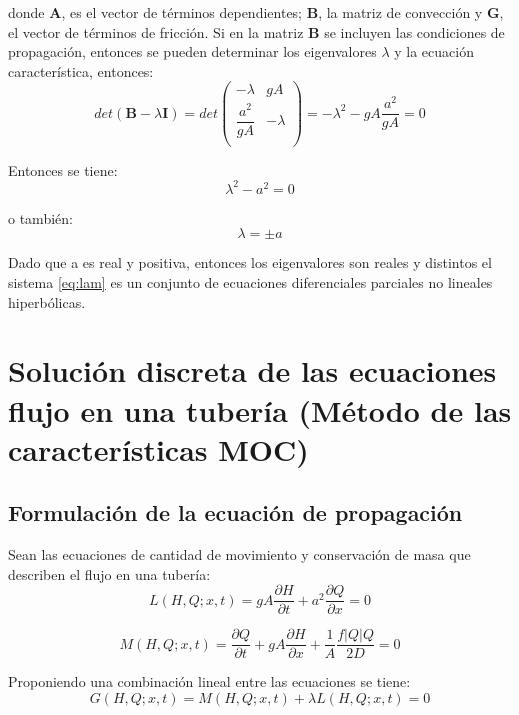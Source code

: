 \documentclass[letterpaper]{report}
\begin{document}
donde $\mathbf{A}$, es el vector de términos dependientes; $\mathbf{B}$, la matriz de convección y $\mathbf{G}$, el vector de términos de fricción.
Si en la matriz $\mathbf{B}$ se incluyen las condiciones de propagación, entonces se pueden determinar los eigenvalores $\lambda$ y la ecuación 
característica, entonces:
\begin{equation*}
	det(\mathbf{B}-\lambda\mathbf{I}) = det\left(
	\begin{matrix}
		-\lambda &gA \\
		\dfrac{a^2}{gA} &-\lambda\\
	\end{matrix}
	\right) = -\lambda^2-gA\dfrac{a^2}{gA}=0
\end{equation*}

Entonces se tiene:
\begin{equation}
	\lambda^2-a^2=0
\end{equation}

o también:
\begin{equation}
	\lambda=\pm a
\label{eq:lam}
\end{equation}

Dado que a es real y positiva, entonces los eigenvalores son reales y distintos el sistema \ref{eq:lam} 
es un conjunto de ecuaciones diferenciales parciales no lineales hiperbólicas.

\section{Solución discreta de las ecuaciones flujo en una tubería (Método de las características MOC)}
\subsection{Formulación de la ecuación de propagación}
Sean las ecuaciones de cantidad de movimiento y conservación de masa que describen el flujo en una tubería:
\begin{equation}
	L(H,Q;x,t)=gA\frac{\partial H}{\partial t}+a^2\frac{\partial Q}{\partial x}=0
\label{eq:mov2}
\end{equation}

\begin{equation}
	M(H,Q;x,t)=\frac{\partial Q}{\partial t}+gA\frac{\partial H}{\partial x}+\frac{1}{A}\frac{f\left|Q\right|Q}{2D}=0
\label{eq:masa22}
\end{equation}

Proponiendo una combinación lineal entre las ecuaciones se tiene:
\begin{equation}
	G(H,Q;x,t)=M(H,Q;x,t)+\lambda L(H,Q;x,t)=0
\label{eq:sumaml}
\end{equation}
\end{document}
